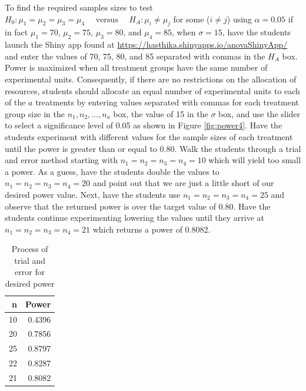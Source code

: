 \documentclass[
]{article}
\begin{document}
To find the required samples sizes to test \(H_0: \mu_1 = \mu_2 = \mu_3 = \mu_4 \quad\text{ versus }\quad H_A: \mu_i \neq \mu_j\) for some (\(i \neq j\)) using \(\alpha = 0.05\) if in fact \(\mu_1 = 70\), \(\mu_2 = 75\), \(\mu_3 = 80\), and \(\mu_4 = 85\), when \(\sigma = 15\), have the students launch the Shiny app found at \url{https://hasthika.shinyapps.io/anovaShinyApp/} and enter the values of 70, 75, 80, and 85 separated with commas in the \(H_A\) box. Power is maximized when all treatment groups have the same number of experimental units. Consequently, if there are no restrictions on the allocation of resources, students should allocate an equal number of experimental units to each of the \(a\) treatments by entering values separated with commas for each treatment group size in the \(n_1, n_2,\ldots, n_a\) box, the value of 15 in the \(\sigma\) box, and use the slider to select a significance level of 0.05 as shown in Figure \ref{fig:power4}. Have the students experiment with different values for the sample sizes of each treatment until the power is greater than or equal to 0.80. Walk the students through a trial and error method starting with \(n_1 = n_2 = n_3 = n_4 = 10\) which will yield too small a power. As a guess, have the students double the values to \(n_1 = n_2 = n_3 = n_4 = 20\) and point out that we are just a little short of our desired power value. Next, have the students use \(n_1 = n_2 = n_3 = n_4 = 25\) and observe that the returned power is over the target value of 0.80. Have the students continue experimenting lowering the values until they arrive at \(n_1 = n_2 = n_3 = n_4 = 21\) which returns a power of 0.8082.

\begin{table}

\caption{\label{tab:unnamed-chunk-6}Process of trial and error for desired power}
\centering
\begin{tabular}[t]{rr}
\toprule
n & Power\\
\midrule
10 & 0.4396\\
20 & 0.7856\\
25 & 0.8797\\
22 & 0.8287\\
21 & 0.8082\\
\bottomrule
\end{tabular}
\end{table}
\end{document}
